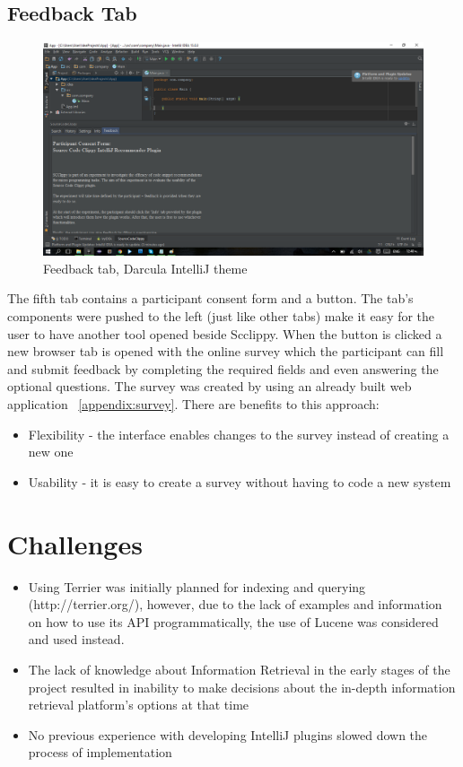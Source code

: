 \documentclass{l4proj}
\begin{document}
\subsection{Feedback Tab}

\begin{figure}[H]
\includegraphics[scale=0.5]{tab-feedback}
\centering
\caption{Feedback tab, Darcula IntelliJ theme}
\label{fig:feedback-tab}
\end{figure}

The fifth tab contains a participant consent form and a button. The tab's components were pushed to the left (just like other tabs) make it easy for the user to have another tool opened beside Scclippy. When the button is clicked a new browser tab is opened with the online survey which the participant can fill and submit feedback by completing the required fields and even answering the optional questions. The survey was created by using an already built web application \cite{smartsurvey} ~\ref{appendix:survey}. There are benefits to this approach:
\begin{itemize}
\item Flexibility - the interface enables changes to the survey instead of creating a new one
\item Usability - it is easy to create a survey without having to code a new system
\end{itemize}




\section{Challenges}
\begin{itemize}
\item Using Terrier was initially planned for indexing and querying (http://terrier.org/), however, due to the lack of examples and information on how to use its API programmatically, the use of Lucene was considered and used instead.

\item The lack of knowledge about Information Retrieval in the early stages of the project resulted in inability to make decisions about the in-depth information retrieval platform's options at that time

\item No previous experience with developing IntelliJ plugins slowed down the process of implementation

\end{itemize}
\end{document}
